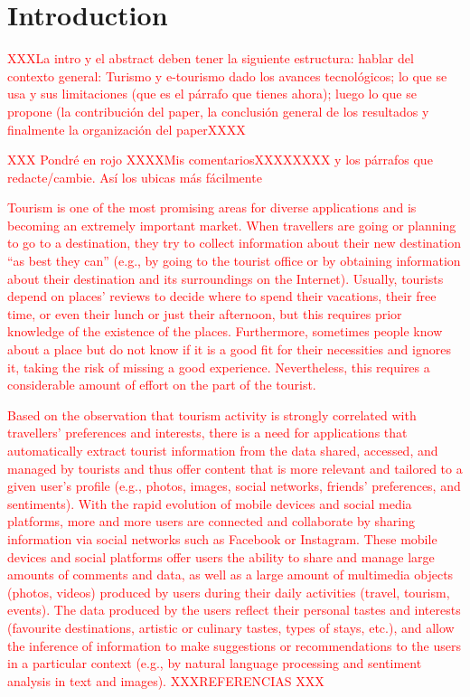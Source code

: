 \section{Introduction}
\textcolor{red}{XXXLa intro y el abstract deben tener la siguiente estructura: hablar del contexto general: Turismo y e-tourismo dado los avances tecnológicos; lo que se usa y sus limitaciones (que es el párrafo que tienes ahora); luego lo que se propone (la contribución del paper, la conclusión general de los resultados y finalmente la organización del paperXXXX}

\textcolor{red}{XXX Pondré en rojo XXXXMis comentariosXXXXXXXX y los párrafos que redacte/cambie. Así los ubicas más fácilmente}


\textcolor{red}{Tourism is one of the most promising areas for diverse applications and is becoming an extremely
important market\cite{buhalis2011tourism,murphy2013tourism,fermoso2015open,ku2015cultivating,alghamdi2016tourism,artemenko2017tourism,kazandzhieva2019tourism,jannach2020interactive}. 
When travellers are going or planning to go to a destination, they try to collect information about their new destination “as best they can” (e.g., by going to the tourist office or by obtaining information about their destination and its surroundings on the Internet). Usually, tourists depend on places' reviews to decide where to spend their vacations, their free time, or even their lunch or just their afternoon, but this requires prior knowledge of the existence of the places. Furthermore, sometimes people know about a place but do not know if it is a good fit for their necessities and ignores it, taking the risk of missing a good experience. Nevertheless, this requires a considerable amount of effort on the part of the tourist. }


\textcolor{red}{Based on the observation that tourism activity is strongly correlated with travellers’ preferences and interests,
there is a need for applications that automatically extract tourist information from the data shared, accessed, and managed by tourists and thus offer content that is more relevant and tailored to a given user’s profile (e.g., photos, images, social networks, friends’ preferences, and sentiments).
With the rapid evolution of mobile devices and social media platforms, more and more users are connected and collaborate by sharing information via social networks such as Facebook or Instagram. These mobile devices and social platforms offer users the ability to share and manage large amounts of comments and data, as well as a large amount of multimedia objects (photos,
videos) produced by users during their daily activities (travel, tourism, events). The data produced by the users reflect their personal tastes and interests (favourite destinations, artistic or culinary tastes, types of stays, etc.), and allow the inference of information to make suggestions or
recommendations to the users in a particular context (e.g., by natural language processing and sentiment analysis in text and images). XXXREFERENCIAS XXX}


